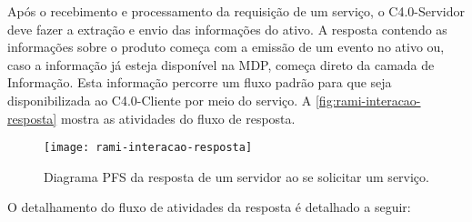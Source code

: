 Após o recebimento e processamento da requisição de um serviço, o C4.0-Servidor deve fazer a extração e envio das informações do ativo. A resposta contendo as informações sobre o produto começa com a emissão de um evento no ativo ou, caso a informação já esteja disponível na MDP, começa direto da camada de Informação. Esta informação percorre um fluxo padrão para que seja disponibilizada ao C4.0-Cliente por meio do serviço. A \autoref{fig:rami-interacao-resposta} mostra as atividades do fluxo de resposta.

\begin{figure}[htb]
	\centering
	\texttt{[image: rami-interacao-resposta]}
	\caption{Diagrama PFS da resposta de um servidor ao se solicitar um serviço.}
	\label{fig:rami-interacao-resposta}
\end{figure}

O detalhamento do fluxo de atividades da resposta é detalhado a seguir:

